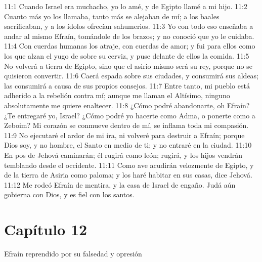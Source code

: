 										11:1 Cuando Israel era muchacho, yo lo amé, y de Egipto llamé a mi hijo. 
										11:2 Cuanto más yo los llamaba, tanto más se alejaban de mí; a los baales sacrificaban, y a los ídolos ofrecían sahumerios. 
										11:3 Yo con todo eso enseñaba a andar al mismo Efraín, tomándole de los brazos; y no conoció que yo le cuidaba. 
										11:4 Con cuerdas humanas los atraje, con cuerdas de amor; y fui para ellos como los que alzan el yugo de sobre su cerviz, y puse delante de ellos la comida. 
										11:5 No volverá a tierra de Egipto, sino que el asirio mismo será su rey, porque no se quisieron convertir. 
										11:6 Caerá espada sobre sus ciudades, y consumirá sus aldeas; las consumirá a causa de sus propios consejos. 
										11:7 Entre tanto, mi pueblo está adherido a la rebelión contra mí; aunque me llaman el Altísimo, ninguno absolutamente me quiere enaltecer. 
										11:8 ¿Cómo podré abandonarte, oh Efraín? ¿Te entregaré yo, Israel? ¿Cómo podré yo hacerte como Adma, o ponerte como a Zeboim? Mi corazón se conmueve dentro de mí, se inflama toda mi compasión. 
										11:9 No ejecutaré el ardor de mi ira, ni volveré para destruir a Efraín; porque Dios soy, y no hombre, el Santo en medio de ti; y no entraré en la ciudad. 
										11:10 En pos de Jehová caminarán; él rugirá como león; rugirá, y los hijos vendrán temblando desde el occidente. 
										11:11 Como ave acudirán velozmente de Egipto, y de la tierra de Asiria como paloma; y los haré habitar en sus casas, dice Jehová. 
										11:12 Me rodeó Efraín de mentira, y la casa de Israel de engaño. Judá aún gobierna con Dios, y es fiel con los santos. 
										\section*{Capítulo 12 }
											Efraín reprendido por su falsedad y opresión 
											
